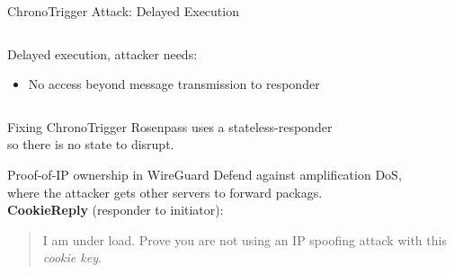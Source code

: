 \begin{frame}{ChronoTrigger Attack: Delayed Execution}
\begin{columns}[fullwidth,T]
\begin{column}{.46\linewidth}
{        \begin{block}{Delayed execution, attacker needs:}
          \begin{itemize}
            \item No access beyond message transmission to responder
          \end{itemize}
          \unskip
        \end{block}

        }

    \end{column}
  \end{columns}
\end{frame}

\begin{frame}{Fixing ChronoTrigger}
  \centering
  Rosenpass uses a stateless-responder
  \\[1.3em] so there is no state to disrupt.
\end{frame}


\begin{frame}{Proof-of-IP ownership in WireGuard}
  Defend against amplification DoS,
  \\ where the attacker gets other servers to forward packags.
  \\[1.3em] \textbf{CookieReply} (responder to initiator):
  \\[1.1em]\blockquote{I am under load. Prove you are not using an IP spoofing attack with this \emph{cookie key}.}
\end{frame}


